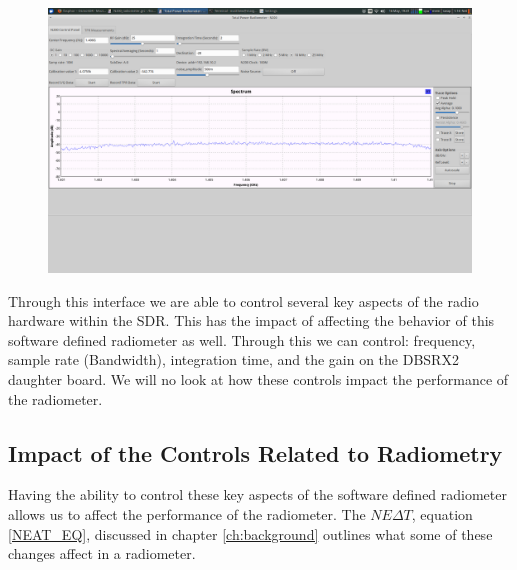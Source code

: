{\begin{figure}[h!tb] 
\centering
\includegraphics[width=17cm]{Images/radiometer_gui.png}
\label{radiometer_gui}
\end{figure}
}

Through this interface we are able to control several key aspects of the radio hardware within the SDR.  This has the impact of affecting the behavior of this software defined radiometer as well.  Through this we can control: frequency, sample rate (Bandwidth), integration time, and the gain on the DBSRX2 daughter board.  We will no look at how these controls impact the performance of the radiometer.  

\subsection{Impact of the Controls Related to Radiometry}

Having the ability to control these key aspects of the software defined radiometer allows us to affect the performance of the radiometer.  The $NE\Delta T$, equation \ref{NEAT_EQ}, discussed in chapter \ref{ch:background} outlines what some of these changes affect in a radiometer.


